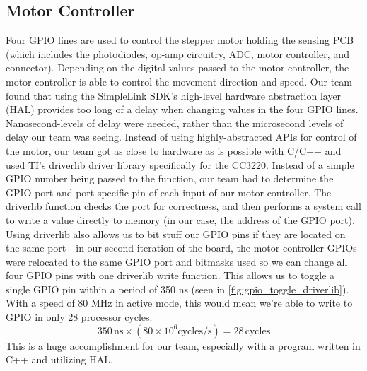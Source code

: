 \documentclass[journal]{IEEEtran}
\begin{document}
\subsection{Motor Controller}
Four GPIO lines are used to control the stepper motor holding the sensing PCB (which includes the photodiodes, op-amp circuitry, ADC, motor controller, and connector). Depending on the digital values passed to the motor controller, the motor controller is able to control the movement direction and speed. Our team found that using the SimpleLink SDK's high-level hardware abstraction layer (HAL) provides too long of a delay when changing values in the four GPIO lines. Nanosecond-levels of delay were needed, rather than the microsecond levels of delay our team was seeing. Instead of using highly-abstracted APIs for control of the motor, our team got as close to hardware as is possible with C/C++ and used TI's driverlib driver library specifically for the CC3220. Instead of a simple GPIO number being passed to the function, our team had to determine the GPIO port and port-specific pin of each input of our motor controller. The driverlib function checks the port for correctness, and then performs a system call to write a value directly to memory (in our case, the address of the GPIO port). Using driverlib also allows us to bit stuff our GPIO pins if they are located on the same port---in our second iteration of the board, the motor controller GPIOs were relocated to the same GPIO port and bitmasks used so we can change all four GPIO pins with one driverlib write function. This allows us to toggle a single GPIO pin within a period of 350 ns (seen in \ref{fig:gpio_toggle_driverlib}). With a speed of 80 MHz in active mode, this would mean we're able to write to GPIO in only 28 processor cycles.
\begin{equation}
	350\,\mathrm{ns} \times (80\times10^6\mathrm{cycles/s}) = 28\,\mathrm{cycles}
\end{equation}
This is a huge accomplishment for our team, especially with a program written in C++ and utilizing HAL.
\end{document}

